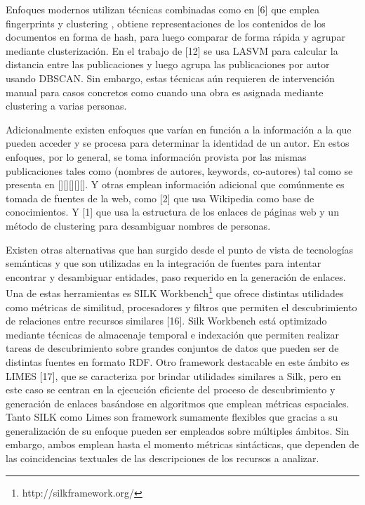 \documentclass[conference]{IEEEtran}
\begin{document}
Enfoques  modernos utilizan técnicas combinadas como en [6] que emplea  fingerprints y clustering , obtiene representaciones de los contenidos de los documentos en forma de hash, para luego comparar de forma rápida y agrupar mediante clusterización. En el trabajo de [12] se usa LASVM para calcular la distancia entre las publicaciones y luego agrupa las publicaciones por autor usando DBSCAN. Sin embargo, estas técnicas aún requieren de intervención manual para casos concretos como cuando una obra es asignada mediante clustering a varias personas.

Adicionalmente existen enfoques que varían en función a la información a la que pueden acceder y se procesa para determinar la identidad de un autor. En estos enfoques, por lo general, se toma información provista por las mismas publicaciones tales como  (nombres de autores, keywords, co-autores) tal como se presenta en  [][][][][]. Y otras emplean información adicional que comúnmente es tomada de fuentes de la web, como [2] que usa Wikipedia como base de conocimientos. Y [1]  que  usa la estructura de los enlaces de páginas web y un método de clustering para desambiguar nombres de personas. 

Existen otras alternativas que han surgido desde el punto de vista de tecnologías semánticas y que son utilizadas en la integración de fuentes para intentar encontrar y desambiguar entidades, paso requerido en la generación de enlaces. Una de estas herramientas es SILK Workbench\footnote{http://silkframework.org/} que ofrece distintas utilidades como métricas de similitud, procesadores y filtros que permiten el descubrimiento de relaciones entre recursos similares [16]. Silk Workbench está optimizado mediante técnicas de almacenaje temporal e indexación  que permiten realizar tareas de descubrimiento sobre grandes conjuntos de datos que pueden  ser de distintas fuentes en formato RDF. Otro framework destacable en este ámbito es LIMES [17], que se caracteriza por brindar utilidades similares a Silk, pero en este caso se centran en la ejecución eficiente del proceso de descubrimiento y generación de enlaces basándose en algoritmos que emplean métricas espaciales. Tanto  SILK como Limes son framework sumamente flexibles  que gracias a su generalización de su enfoque pueden ser empleados sobre múltiples ámbitos. Sin embargo, ambos emplean hasta el momento métricas sintácticas, que dependen de las coincidencias textuales de las  descripciones de los recursos a analizar.
\end{document}
